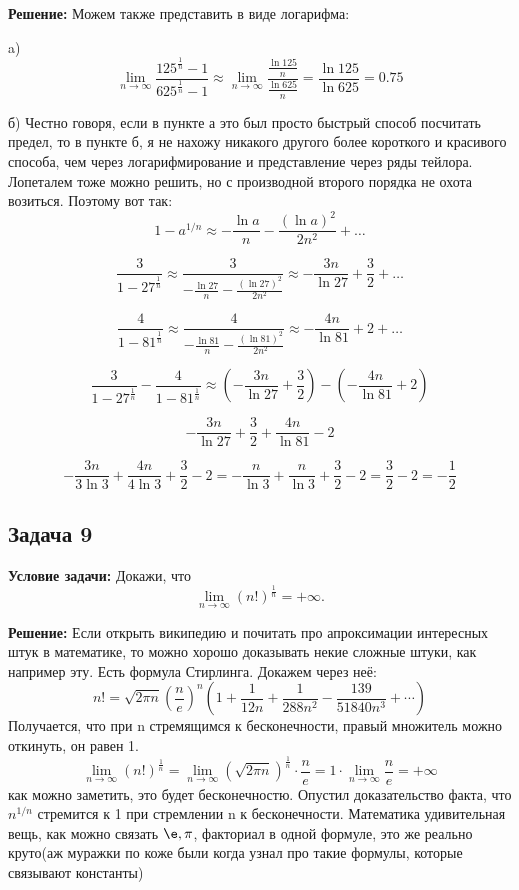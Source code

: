 \documentclass[a4paper,12pt]{article}
\begin{document}
\textbf{Решение:}
Можем также представить в виде логарифма:

a)
\[
\lim_{n \to \infty} \frac{125^{\frac{1}{n}} - 1}{625^{\frac{1}{n}} - 1} \approx \lim_{n \to \infty} \frac{\frac{\ln 125}{n}}{\frac{\ln 625}{n}} = \frac{\ln 125}{\ln 625}=0.75
\]

б)
Честно говоря, если в пункте а это был просто быстрый способ посчитать предел, то в пункте б, я не нахожу никакого другого более короткого и красивого способа, чем через логарифмирование и представление через ряды тейлора. Лопеталем тоже можно решить, но с производной второго порядка не охота возиться. Поэтому вот так: 
\[
1 - a^{1/n} \approx -\frac{\ln a}{n} - \frac{(\ln a)^2}{2n^2} + \dots
\]

\[
\frac{3}{1 - 27^{\frac{1}{n}}} \approx \frac{3}{ -\frac{\ln 27}{n} - \frac{(\ln 27)^2}{2n^2}} \approx -\frac{3n}{\ln 27} + \frac{3}{2} + \dots
\]

\[
\frac{4}{1 - 81^{\frac{1}{n}}} \approx \frac{4}{ -\frac{\ln 81}{n} - \frac{(\ln 81)^2}{2n^2}} \approx -\frac{4n}{\ln 81} + 2 + \dots
\]

\[
\frac{3}{1 - 27^{\frac{1}{n}}} - \frac{4}{1 - 81^{\frac{1}{n}}} \approx \left(-\frac{3n}{\ln 27} + \frac{3}{2}\right) - \left(-\frac{4n}{\ln 81} + 2\right)
\]

\[
-\frac{3n}{\ln 27} + \frac{3}{2} + \frac{4n}{\ln 81} - 2
\]

\[
-\frac{3n}{3\ln 3} + \frac{4n}{4\ln 3} + \frac{3}{2} - 2 = -\frac{n}{\ln 3} + \frac{n}{\ln 3} + \frac{3}{2} - 2 = \frac{3}{2} - 2 = -\frac{1}{2}
\]
\vspace{1cm}

\subsection{Задача 9}


\textbf{Условие задачи:}
Докажи, что
\[
\lim_{n \to \infty}  (n!)^{\frac{1}{n}} = +\infty.
\]

\textbf{Решение:}
Если открыть википедию и почитать про апроксимации интересных штук в математике, то можно хорошо доказывать некие сложные штуки, как например эту. Есть формула Стирлинга. Докажем через неё:
\[
n! = \sqrt{2\pi n} \left( \frac{n}{e} \right)^n \left( 1 + \frac{1}{12n} + \frac{1}{288n^2} - \frac{139}{51840n^3} + \cdots \right)
\]
Получается, что при n стремящимся к бесконечности, правый множитель можно откинуть, он равен 1.
   \[
   \lim_{n \to \infty} (n!)^{\frac{1}{n}} = \lim_{n \to \infty} (\sqrt{2\pi n})^{\frac{1}{n}} \cdot \frac{n}{e} = 1 \cdot \lim_{n \to \infty} \frac{n}{e} = +\infty
   \]
как можно заметить, это будет бесконечностю. Опустил доказательство факта, что $n^{1/n}$ стремится к 1 при стремлении n к бесконечности. Математика удивительная вещь, как можно связать $\e, \pi$, факториал в одной формуле, это же реально круто(аж муражки по коже были когда узнал про такие формулы, которые связывают константы)
\end{document}
